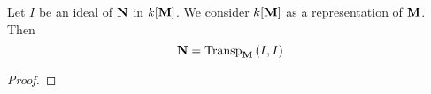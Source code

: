 \begin{lemma}\label{lemma:ideal_of_closed_submonoid_is_stable}
Let $I$ be an ideal of $\mathbf{N}$ in $k[\mathbf{M}]$. We consider $k[\mathbf{M}]$ as a representation of $\mathbf{M}$. Then
$$\mathbf{N} = \mathrm{Transp}_{\mathbf{M}}\left(I,I\right)$$
\end{lemma}
\begin{proof}
\end{proof}

























































